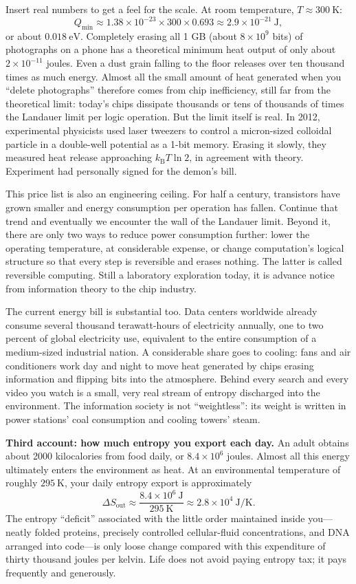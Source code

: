Insert real numbers to get a feel for the scale. At room temperature, $T\approx300\ \mathrm{K}$:
\[
Q_{\min}\approx1.38\times10^{-23}\times300\times0.693\approx2.9\times10^{-21}\ \mathrm{J},
\]
or about $0.018\ \mathrm{eV}$. Completely erasing all 1 GB (about $8\times10^9$ bits) of photographs on a phone has a theoretical minimum heat output of only about $2\times10^{-11}$ joules. Even a dust grain falling to the floor releases over ten thousand times as much energy. Almost all the small amount of heat generated when you ``delete photographs'' therefore comes from chip inefficiency, still far from the theoretical limit: today's chips dissipate thousands or tens of thousands of times the Landauer limit per logic operation. But the limit itself is real. In 2012, experimental physicists used laser tweezers to control a micron-sized colloidal particle in a double-well potential as a 1-bit memory. Erasing it slowly, they measured heat release approaching $k_{\mathrm{B}}T\ln 2$, in agreement with theory. Experiment had personally signed for the demon's bill.

This price list is also an engineering ceiling. For half a century, transistors have grown smaller and energy consumption per operation has fallen. Continue that trend and eventually we encounter the wall of the Landauer limit. Beyond it, there are only two ways to reduce power consumption further: lower the operating temperature, at considerable expense, or change computation's logical structure so that every step is reversible and erases nothing. The latter is called reversible computing. Still a laboratory exploration today, it is advance notice from information theory to the chip industry.

The current energy bill is substantial too. Data centers worldwide already consume several thousand terawatt-hours of electricity annually, one to two percent of global electricity use, equivalent to the entire consumption of a medium-sized industrial nation. A considerable share goes to cooling: fans and air conditioners work day and night to move heat generated by chips erasing information and flipping bits into the atmosphere. Behind every search and every video you watch is a small, very real stream of entropy discharged into the environment. The information society is not ``weightless'': its weight is written in power stations' coal consumption and cooling towers' steam.

\textbf{Third account: how much entropy you export each day.} An adult obtains about 2000 kilocalories from food daily, or $8.4\times10^6$ joules. Almost all this energy ultimately enters the environment as heat. At an environmental temperature of roughly $295\ \mathrm{K}$, your daily entropy export is approximately
\[
\Delta S_{\text{out}}\approx\frac{8.4\times10^6\ \mathrm{J}}{295\ \mathrm{K}}\approx2.8\times10^4\ \mathrm{J/K}.
\]
The entropy ``deficit'' associated with the little order maintained inside you---neatly folded proteins, precisely controlled cellular-fluid concentrations, and DNA arranged into code---is only loose change compared with this expenditure of thirty thousand joules per kelvin. Life does not avoid paying entropy tax; it pays frequently and generously.

